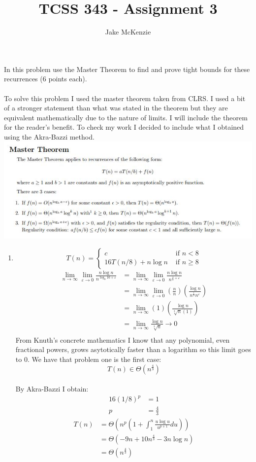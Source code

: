 \documentclass[paper=a4,fontsize=11pt]{article}
\begin{document}
\title{TCSS 343 - Assignment 3}
\author{Jake McKenzie}
\maketitle
In this problem use the Master Theorem to find and prove tight bounds for these recurrences (6 points each).\\\\
To solve this problem I used the master theorem taken from CLRS. I used a bit of a stronger statement than what was stated in the theorem but they are equivalent mathematically due to the nature of limits. I will include the theorem for the reader's benefit. To check my work I decided to include what I obtained using the Akra-Bazzi method.\\
\includegraphics[width=\linewidth]{mastertheorem.JPG}
\begin{enumerate}
\item
\[
T(n) = \left\{
\begin{array}{cl}
c & \textrm{ if } n < 8\\
16T(n/8) + n\log{n} & \textrm{ if } n \geq 8
\end{array}
\right.
\]
\begin{align*}
\lim_{n\to\infty}\lim_{\varepsilon\to0}{\frac{n\log{n}}{n^{\log_{8}{16}+\varepsilon}}}&=\lim_{n\to\infty}\lim_{\varepsilon\to0}{\frac{n\log{n}}{n^{\frac{4}{3}+\varepsilon}}}\\
&=\lim_{n\to\infty}\lim_{\varepsilon\to0}{(\frac{n}{n})(\frac{\log{n}}{n^{\frac{1}{3}}n^{\varepsilon}})}\\
&=\lim_{n\to\infty}{(1)(\frac{\log{n}}{\sqrt[3]{n}(1)})}\\
&=\lim_{n\to\infty}{\frac{\log{n}}{\sqrt[3]{n}}}\rightarrow0\\
\end{align*}
From Knuth's concrete mathematics I know that any polynomial, even fractional powers, grows asytotically faster than a logarithm so this limit goes to 0. We have that problem one is the first case:
$$T(n)\in\Theta(n^{\frac{4}{3}})$$\\
By Akra-Bazzi I obtain:\\
\begin{align*}
16(1/8)^{p}&=1\\
p&=\frac{4}{3}
\end{align*}
\begin{align*}
T(n) &= \Theta(n^{p}(1+\int_{1}^{n}{\frac{u\log{u}}{u^{p+1}}du}))\\
&= \Theta(-9n+10n^{\frac{4}{3}}-3n\log{n})\\
&= \Theta(n^{\frac{4}{3}})\\
\end{align*}
\end{enumerate}
\end{document}
